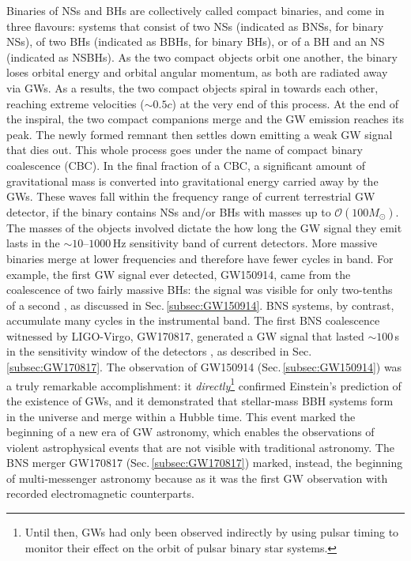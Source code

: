 \documentclass[binding=0.6cm, LaM]{sapthesis}
\begin{document}
        Binaries of NSs and BHs are collectively called compact binaries,
        and come in three flavours: systems that consist of two NSs (indicated as BNSs, for binary NSs), 
	of two BHs (indicated as BBHs, for binary BHs), or of a BH and an NS (indicated as NSBHs).
        As the two compact objects orbit one another, the binary loses orbital energy and orbital angular momentum, 
	as both are radiated away via GWs.
        As a results, the two compact objects spiral in towards each other, 
	reaching extreme velocities ($\sim 0.5c$) at the very end of this process. 
        At the end of the inspiral, the two compact companions merge and 
	the GW emission reaches its peak. 
	The newly formed remnant then settles down emitting a weak GW signal that dies out.  
	This whole process goes under the name of compact binary coalescence (CBC).
	In the final fraction of a CBC, a significant amount of gravitational mass is converted 
	into gravitational energy carried away by the GWs.  
	These waves fall within the frequency range of current terrestrial GW detector, 
	if the binary contains NSs and/or BHs with masses up to $\mathcal{O}(100M_\odot)$.
        The masses of the objects involved dictate the how long the GW signal they emit 
	lasts in the $\sim 10$--$1000$\,Hz sensitivity band of current detectors.
        More massive binaries merge at lower frequencies and therefore have fewer cycles in band.
        For example, the first GW signal ever detected, GW150914, came from the coalescence of two fairly massive BHs: 
	the signal was visible for only two-tenths of a second \cite{14}, as discussed in Sec.\,\ref{subsec:GW150914}. 
        BNS systems, by contrast, accumulate many cycles in the instrumental band.
        The first BNS coalescence witnessed by LIGO-Virgo, GW170817, 
	generated a GW signal that lasted $\sim 100\,$s in the sensitivity window of the detectors \cite{15}, 
	as described in Sec.\,\ref{subsec:GW170817}.
	The observation of GW150914 (Sec.\,\ref{subsec:GW150914}) was a truly remarkable accomplishment: 
	it \emph{directly}\footnote{Until then, GWs had only been observed indirectly by using pulsar timing to monitor 
        their effect on the orbit of pulsar binary star systems.} confirmed Einstein's prediction of the existence of GWs, 
	and it demonstrated that stellar-mass BBH systems form in the universe and merge within a Hubble time.
	This event marked the beginning of a new era of GW astronomy, 
	which enables the observations of violent astrophysical events that are not visible with traditional astronomy.
	The BNS merger GW170817 (Sec.\,\ref{subsec:GW170817}) marked, instead, the beginning of multi-messenger astronomy 
	because as it was the first GW observation with recorded electromagnetic counterparts.  	
\end{document}
